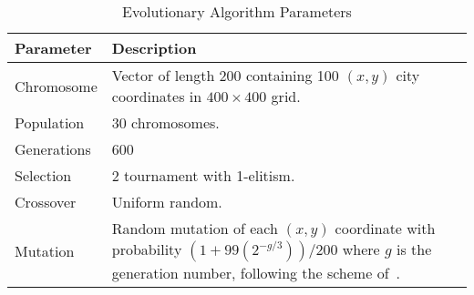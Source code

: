 \documentclass[conference]{IEEEtran}
\begin{document}
\begin{table}[!t]
\caption{Evolutionary Algorithm Parameters} \label{AlgorithmParameters}
\begin{tabularx}{\columnwidth}{lX}
\toprule
\textbf{Parameter} & \textbf{Description}\\
\midrule[\heavyrulewidth]
Chromosome & {Vector of length 200 containing 100 $(x, y)$ city coordinates in $400 \times 400$ grid.}\\ \midrule
Population & 30 chromosomes.\\ \midrule
Generations & 600\\ \midrule
Selection & 2 tournament with 1-elitism.\\ \midrule
Crossover & Uniform random.\\ \midrule
Mutation & {Random mutation of each $(x,y)$ coordinate with probability $(1 + 99(2^{-g/3}))/200$ where $g$ is the generation number, following the scheme of~\cite{Kratica}.}\\
\bottomrule
\end{tabularx}
\end{table}
\end{document}
